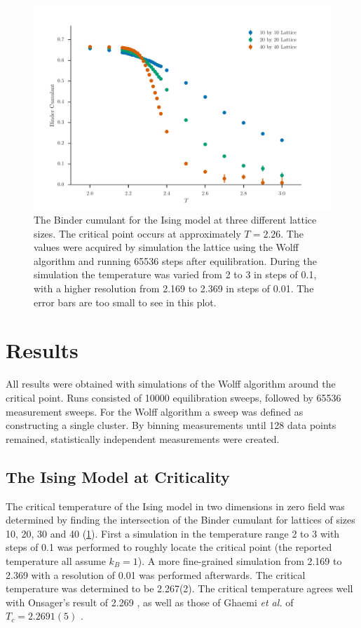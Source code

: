 \documentclass[11pt, a4paper]{report} %
\begin{document}
\begin{figure}[htb]
	\includegraphics[width=\textwidth]{wolff_binder_cumulant.pdf}
	\caption{The Binder cumulant for the Ising model at three different lattice sizes. The critical point occurs at approximately \(T = 2.26\). The values were acquired by simulation the lattice using the Wolff algorithm and running 65536 steps after equilibration. During the simulation the temperature was varied from 2 to 3 in steps of 0.1, with a higher resolution from 2.169 to 2.369 in steps of 0.01. The error bars are too small to see in this plot.}
	\label{fig:ising_binder_cumulant}
\end{figure}

\chapter{Results}

All results were obtained with simulations of the Wolff algorithm around the critical point.
Runs consisted of 10000 equilibration sweeps, followed by 65536 measurement sweeps.
For the Wolff algorithm a sweep was defined as constructing a single cluster.
By binning measurements until 128 data points remained, statistically independent measurements were created.

\section{The Ising Model at Criticality}

The critical temperature of the Ising model in two dimensions in zero field was determined by finding the intersection of the Binder cumulant for lattices of sizes 10, 20, 30 and 40 (\cref{fig:ising_binder_cumulant}).
First a simulation in the temperature range 2 to 3 with steps of 0.1 was performed to roughly locate the critical point (the reported temperature all assume \(k_B = 1\)).
A more fine-grained simulation from 2.169 to 2.369 with a resolution of 0.01 was performed afterwards.
The critical temperature was determined to be 2.267(2).
The critical temperature agrees well with Onsager's result of 2.269 \cite{onsager:1944}, as well as those of Ghaemi \textit{et al.} of \(T_c = 2.2691(5)\) \cite{ghaemi:2001}.
\end{document}
